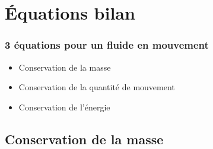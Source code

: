 \documentclass[%
	final, %
	 10pt, %
 	compress, %
hyperref={bookmarks=true}	
]{beamer}
\newcommand\pgfmathsinandcos[3]{%
  \pgfmathsetmacro#1{sin(#3)}%
  \pgfmathsetmacro#2{cos(#3)}%
}
\newcommand\LongitudePlane[3][current plane]{%
  \pgfmathsinandcos\sinEl\cosEl{#2} %
  \pgfmathsinandcos\sint\cost{#3} %
  \tikzset{#1/.style={cm={\cost,\sint*\sinEl,0,\cosEl,(0,0)}}}
}
\newcommand\LatitudePlane[3][current plane]{%
  \pgfmathsinandcos\sinEl\cosEl{#2} %
  \pgfmathsinandcos\sint\cost{#3} %
  \pgfmathsetmacro\yshift{\cosEl*\sint}
  \tikzset{#1/.style={cm={\cost,0,0,\cost*\sinEl,(0,\yshift)}}} %
}
\newcommand\DrawLongitudeCirclered[2][1]{
  \LongitudePlane{\angEl}{#2}
  \tikzset{current plane/.prefix style={scale=#1}}
  \pgfmathsetmacro\angVis{atan(sin(#2)*cos(\angEl)/sin(\angEl))} %
  \draw[current plane,red,thick] (170:1) arc (170:180:1);
}%
\newcommand\DrawLatitudeCirclered[2][1]{
  \LatitudePlane{\angEl}{#2}
  \tikzset{current plane/.prefix style={scale=#1}}
  \pgfmathsetmacro\sinVis{sin(#2)/cos(#2)*sin(\angEl)/cos(\angEl)}
  \pgfmathsetmacro\angVis{asin(min(1,max(\sinVis,-1)))}
\draw[current plane,red,thick] (-45:1) arc (-45:-35:1);

}
\begin{document}

	
    	



\section{Équations bilan}
\label{sec:nombr-adim}


\begin{frame}\frametitle{3 équations pour un fluide en mouvement}
\begin{itemize}
\item Conservation de la masse
\item Conservation de la quantité de mouvement
\item Conservation de l'énergie
\end{itemize}
\end{frame}

\subsection{Conservation de la masse}
\label{sec:conservation-de-la}
\end{document}
